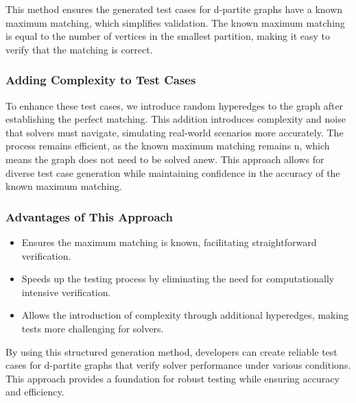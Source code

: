 This method ensures the generated test cases for d-partite graphs have a known maximum matching, which simplifies validation. The known maximum matching is equal to the number of vertices in the smallest partition, making it easy to verify that the matching is correct.

\subsubsection{Adding Complexity to Test Cases}
To enhance these test cases, we introduce random hyperedges to the graph after establishing the perfect matching. This addition introduces complexity and noise that solvers must navigate, simulating real-world scenarios more accurately. The process remains efficient, as the known maximum matching remains n, which means the graph does not need to be solved anew. This approach allows for diverse test case generation while maintaining confidence in the accuracy of the known maximum matching.

\subsubsection{Advantages of This Approach}
\begin{itemize}
    \item Ensures the maximum matching is known, facilitating straightforward verification.
    \item Speeds up the testing process by eliminating the need for computationally intensive verification.
    \item Allows the introduction of complexity through additional hyperedges, making tests more challenging for solvers.
\end{itemize}

By using this structured generation method, developers can create reliable test cases for d-partite graphs that verify solver performance under various conditions. This approach provides a foundation for robust testing while ensuring accuracy and efficiency.
